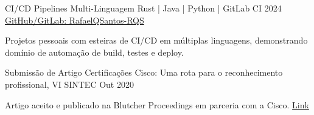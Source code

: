 \resumeProject
{CI/CD Pipelines Multi-Linguagem}
{Rust | Java | Python | GitLab CI}
{2024}
{\href{https://github.com/RafaelQSantos-RQS}{GitHub/GitLab: RafaelQSantos-RQS}}
\resumeItemListStart
\item {Projetos pessoais com esteiras de CI/CD em múltiplas linguagens, demonstrando domínio de automação de build, testes e deploy.}
\resumeItemListEnd

\resumeProject
{Submissão de Artigo}
{Certificações Cisco: Uma rota para o reconhecimento profissional, VI SINTEC}
{Out 2020}
{}

\resumeItemListStart
\item {Artigo aceito e publicado na Blutcher Proceedings em parceria com a Cisco.} \href{https://www.proceedings.blucher.com.br/article-details/certificaes-cisco-uma-rota-para-o-reconhecimento-profissional-35678}{Link}
\resumeItemListEnd
\vspace{-2mm}


\resumeSubHeadingListEnd
\vspace{-5.5mm}


